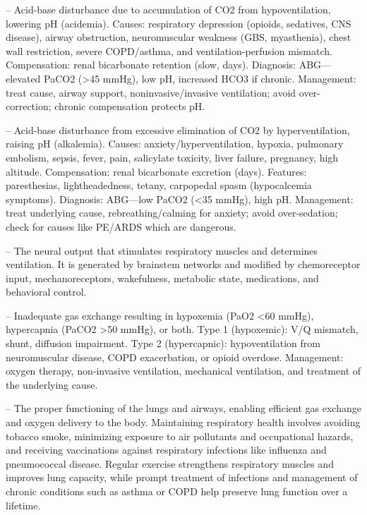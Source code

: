 -- Acid-base disturbance due to accumulation of CO2 from hypoventilation, lowering pH (acidemia). Causes: respiratory depression (opioids, sedatives, CNS disease), airway obstruction, neuromuscular weakness (GBS, myasthenia), chest wall restriction, severe COPD/asthma, and ventilation-perfusion mismatch. Compensation: renal bicarbonate retention (slow, days). Diagnosis: ABG—elevated PaCO2 (>45 mmHg), low pH, increased HCO3 if chronic. Management: treat cause, airway support, noninvasive/invasive ventilation; avoid over-correction; chronic compensation protects pH.

-- Acid-base disturbance from excessive elimination of CO2 by hyperventilation, raising pH (alkalemia). Causes: anxiety/hyperventilation, hypoxia, pulmonary embolism, sepsis, fever, pain, salicylate toxicity, liver failure, pregnancy, high altitude. Compensation: renal bicarbonate excretion (days). Features: paresthesias, lightheadedness, tetany, carpopedal spasm (hypocalcemia symptoms). Diagnosis: ABG—low PaCO2 (<35 mmHg), high pH. Management: treat underlying cause, rebreathing/calming for anxiety; avoid over-sedation; check for causes like PE/ARDS which are dangerous.

-- The neural output that stimulates respiratory muscles and determines ventilation. It is generated by brainstem networks and modified by chemoreceptor input, mechanoreceptors, wakefulness, metabolic state, medications, and behavioral control.

-- Inadequate gas exchange resulting in hypoxemia (PaO2 <60 mmHg), hypercapnia (PaCO2 >50 mmHg), or both. Type 1 (hypoxemic): V/Q mismatch, shunt, diffusion impairment. Type 2 (hypercapnic): hypoventilation from neuromuscular disease, COPD exacerbation, or opioid overdose. Management: oxygen therapy, non-invasive ventilation, mechanical ventilation, and treatment of the underlying cause.

-- The proper functioning of the lungs and airways, enabling efficient gas exchange and oxygen delivery to the body. Maintaining respiratory health involves avoiding tobacco smoke, minimizing exposure to air pollutants and occupational hazards, and receiving vaccinations against respiratory infections like influenza and pneumococcal disease. Regular exercise strengthens respiratory muscles and improves lung capacity, while prompt treatment of infections and management of chronic conditions such as asthma or COPD help preserve lung function over a lifetime.

